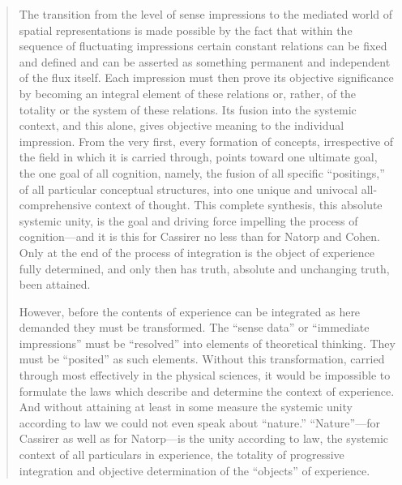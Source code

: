 \begin{quote}
    The transition from the level of sense impressions to the mediated world of spatial representations is made possible by the fact that within the sequence of fluctuating impressions certain constant relations can be fixed and defined and can be asserted as something permanent and independent of the flux itself.  Each impression must then prove its objective significance by becoming an integral element of these relations or, rather, of the totality or the system of these relations.  Its fusion into the systemic context, and this alone, gives objective meaning to the individual impression.  From the very first, every formation of concepts, irrespective of the field in which it is carried through, points toward one ultimate goal, the one goal of all cognition, namely, the fusion of all specific ``positings,'' of all particular conceptual structures, into one unique and univocal all-comprehensive context of thought.  This complete synthesis, this absolute systemic unity, is the goal and driving force impelling the process of cognition---and it is this for Cassirer no less than for Natorp and Cohen.  Only at the end of the process of integration is the object of experience fully determined, and only then has truth, absolute and unchanging truth, been attained.  

    However, before the contents of experience can be integrated as here demanded they must be transformed.  The ``sense data'' or ``immediate impressions'' must be ``resolved'' into elements of theoretical thinking.  They must be ``posited'' as such elements.  Without this transformation, carried through most effectively in the physical sciences, it would be impossible to formulate the laws which describe and determine the context of experience.  And without attaining at least in some measure the systemic unity according to law we could not even speak about ``nature.''  ``Nature''---for Cassirer as well as for Natorp---is the unity according to law, the systemic context of all particulars in experience, the totality of progressive integration and objective determination of the ``objects'' of experience.  


\end{quote}
